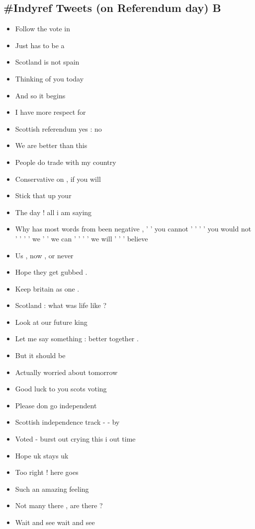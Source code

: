 \documentclass[tikz]{article}
\begin{document}
\begin{multicols}{2}
    \subsection*{\#Indyref Tweets (on Referendum day) B}
    \begin{itemize}[noitemsep,nolistsep,label={}]
		\item{Follow the vote in}
		\item{Just has to be a}
		\item{Scotland is not spain}
		\item{Thinking of you today}
		\item{And so it begins}
		\item{I have more respect for}
		\item{Scottish referendum yes : no}
		\item{We are better than this}
		\item{People do trade with my country}
		\item{Conservative on , if you will}
		\item{Stick that up your}
		\item{The day ! all i am saying}
		\item{Why has most words from been negative , ' ' you cannot ' ' ' ' you would not ' ' ' ' we ' ' we can ' ' ' ' we will ' ' ' believe}
		\item{Us , now , or never}
		\item{Hope they get gubbed .}
		\item{Keep britain as one .}
		\item{Scotland : what was life like ?}
		\item{Look at our future king}
		\item{Let me say something : better together .}
		\item{But it should be}
		\item{Actually worried about tomorrow}
		\item{Good luck to you scots voting}
		\item{Please don go independent}
		\item{Scottish independence track - - by}
		\item{Voted - burst out crying this i out time}
		\item{Hope uk stays uk}
		\item{Too right ! here goes}
		\item{Such an amazing feeling}
		\item{Not many there , are there ?}
		\item{Wait and see wait and see}

\end{itemize}
\end{multicols}
\end{document}
